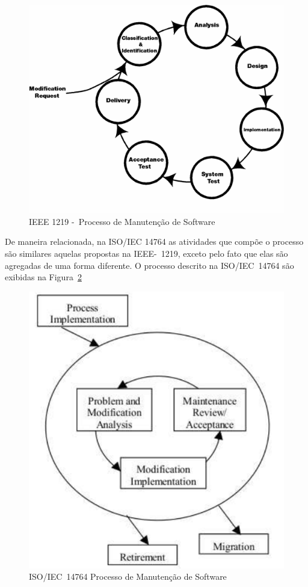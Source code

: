 \begin{figure}[htpb] \centering
	\includegraphics[width=0.7\linewidth]
	{./chapter-manutencao-software-visao-geral/img/ieee-1219-98-processo-manutencao.png}
	\caption{IEEE 1219 -~Processo de Manutenção de Software}\label{fig:ieee-1219-processo-man-software}
\end{figure}

De maneira relacionada, na ISO/IEC 14764 as atividades que compõe o processo são
similares aquelas propostas na IEEE-~1219, exceto pelo fato que elas são
agregadas de uma forma diferente. O processo descrito na ISO/IEC~14764 são
exibidas na Figura~\ref{fig:ieee-14764-processo-manutencao}

\begin{figure}[htpb] \centering
	\includegraphics[width=0.7\linewidth]
{chapter-manutencao-software-visao-geral/img/ieee-14764-processo-manutencao.pdf}
	\caption{ISO/IEC~14764 Processo de Manutenção de Software}
\label{fig:ieee-14764-processo-manutencao} \end{figure}

